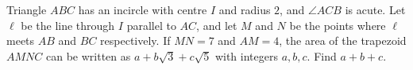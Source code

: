 Triangle $ABC$ has an incircle with centre $I$ and radius $2$, and $\angle ACB$ is acute. Let $\ell$ be the line through $I$ parallel to $AC$, and let $M$ and $N$ be the points where $\ell$ meets $AB$ and $BC$ respectively. If $MN=7$ and $AM=4$, the area of the trapezoid $AMNC$ can be written as $a+b\sqrt3+c\sqrt5$ with integers $a,b,c$. Find $a+b+c$.
